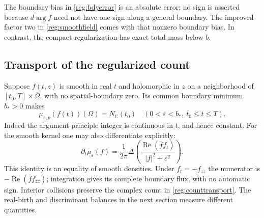 The boundary bias in \eqref{reg:bdyerror} is an absolute error; no sign
is asserted because $d\arg f$ need not have one sign along a general
boundary. The improved factor two in \eqref{reg:smoothfield} comes with
that nonzero boundary bias. In contrast, the compact regularization has
exact total mass below $b$.

\subsection{Transport of the regularized count}
Suppose $f(t,z)$ is smooth in real $t$ and holomorphic in $z$ on a
neighborhood of $[t_0,T]\times\overline\Omega$, with no spatial-boundary
zero. Its common boundary minimum $b_*>0$ makes
\begin{equation}\label{reg:counttransport}
 \mu_{\varepsilon,p}(f(t))(\Omega)=N_{\mathbb C}(t_0)
 \quad(0<\varepsilon<b_*,\ t_0\le t\le T).
\end{equation}
Indeed the argument-principle integer is continuous in $t$, and hence
constant. For the smooth kernel one may also differentiate explicitly:
\begin{equation}\label{reg:heattransport}
 \partial_t\widetilde\mu_\varepsilon(f)
 =\frac1{2\pi}\Delta\left(
       \frac{\operatorname{Re}(\overline f f_t)}{|f|^2+\varepsilon^2}
                       \right).
\end{equation}
This identity is an equality of smooth densities. Under $f_t=-f_{zz}$
the numerator is $-\operatorname{Re}(\overline f f_{zz})$; integration
gives its complete boundary flux, with no automatic sign. Interior
collisions preserve the complex count in \eqref{reg:counttransport}.
The real-birth and discriminant balances in the next section measure
different quantities.
